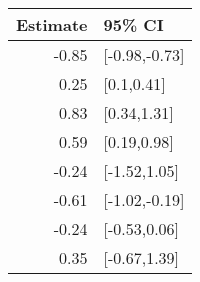 \begin{tabular}{rl}
  \hline
Estimate & 95\% CI \\ 
  \hline
-0.85 & [-0.98,-0.73] \\ 
  0.25 & [0.1,0.41] \\ 
  0.83 & [0.34,1.31] \\ 
  0.59 & [0.19,0.98] \\ 
  -0.24 & [-1.52,1.05] \\ 
  -0.61 & [-1.02,-0.19] \\ 
  -0.24 & [-0.53,0.06] \\ 
  0.35 & [-0.67,1.39] \\ 
   \hline
\end{tabular}

